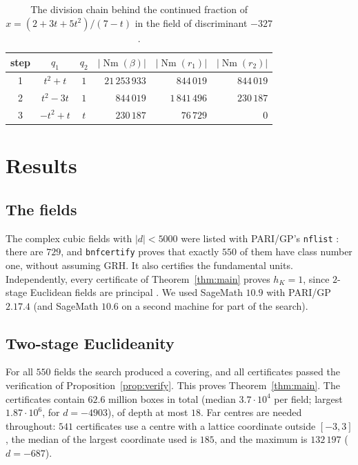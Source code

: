 \documentclass[11pt]{amsart}
\theoremstyle{definition}
\theoremstyle{remark}
\numberwithin{equation}{section}
\newcommand{\Nm}{\operatorname{Nm}}
\begin{document}
\begin{table}[ht]
\centering\small
\begin{tabular}{cccrrr}
\toprule
step & $q_1$ & $q_2$ & $|\Nm(\beta)|$ & $|\Nm(r_1)|$ & $|\Nm(r_2)|$\\
\midrule
1 & $t^2+t$ & $1$ & $21\,253\,933$ & $844\,019$ & $844\,019$\\
2 & $t^2-3t$ & $1$ & $844\,019$ & $1\,841\,496$ & $230\,187$\\
3 & $-t^2+t$ & $t$ & $230\,187$ & $76\,729$ & $0$\\
\bottomrule
\end{tabular}
\caption{The division chain behind the continued fraction of $x=(2+3t+5t^2)/(7-t)$ in the field
of discriminant $-327$.}
\label{tab:cf}
\end{table}

\section{Results}\label{sec:results}

\subsection{The fields}\label{sec:fields}
The complex cubic fields with $|d|<5000$ were listed with PARI/GP's \texttt{nflist}
\cite{PARI}: there are $729$, and \texttt{bnfcertify} proves that exactly $550$ of them have class
number one, without assuming GRH. It also certifies the fundamental units. Independently, every
certificate of Theorem~\ref{thm:main} proves $h_K=1$, since $2$-stage Euclidean fields are
principal \cite{Co}. We used SageMath $10.9$ with PARI/GP $2.17.4$ (and SageMath $10.6$ on a
second machine for part of the search).

\subsection{Two-stage Euclideanity}
For all $550$ fields the search produced a covering, and all certificates passed the
verification of Proposition~\ref{prop:verify}. This proves Theorem~\ref{thm:main}. The
certificates contain $62.6$ million boxes in total (median $3.7\cdot10^4$ per field; largest
$1.87\cdot10^6$, for $d=-4903$), of depth at most $18$. Far centres are needed throughout: $541$
certificates use a centre with a lattice coordinate outside $[-3,3]$, the median of the largest
coordinate used is $185$, and the maximum is $132\,197$ ($d=-687$).
\end{document}
